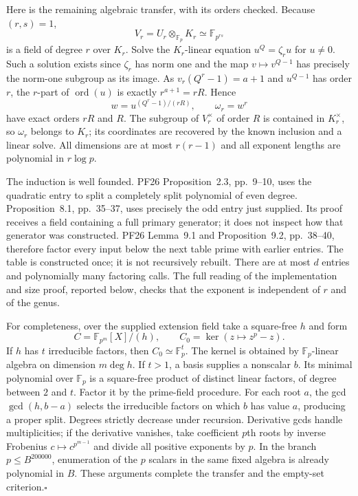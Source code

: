 Here is the remaining algebraic transfer, with its orders checked.
Because $(r,s)=1$,
\[
 V_r=U_r\otimes_{\mathbb F_p}K_r\simeq\mathbb F_{p^{rs}}
\]
is a field of degree $r$ over $K_r$. Solve the $K_r$-linear equation
$u^Q=\zeta_r u$ for $u\ne0$. Such a solution exists since
$\zeta_r$ has norm one and the map $v\mapsto v^{Q-1}$ has precisely
the norm-one subgroup as its image. As
$v_r(Q^r-1)=a+1$ and $u^{Q-1}$ has order $r$, the $r$-part of
$\operatorname{ord}(u)$ is exactly $r^{a+1}=rR$. Hence
\[
 w=u^{(Q^r-1)/(rR)},\qquad \omega_r=w^r
\]
have exact orders $rR$ and $R$. The subgroup of $V_r^\times$ of
order $R$ is contained in $K_r^\times$, so $\omega_r$ belongs to
$K_r$; its coordinates are recovered by the known inclusion and a
linear solve. All dimensions are at most $r(r-1)$ and all exponent
lengths are polynomial in $r\log p$.

The induction is well founded. PF26 Proposition~2.3, pp.~9--10,
uses the quadratic entry to split a completely split polynomial of
even degree. Proposition~8.1, pp.~35--37, uses precisely the odd
entry just supplied. Its proof receives a field containing a full
primary generator; it does not inspect how that generator was
constructed. PF26 Lemma~9.1 and Proposition~9.2, pp.~38--40,
therefore factor every input below the next table prime with earlier
entries. The table is constructed once; it is not recursively rebuilt.
There are at most $d$ entries and polynomially many factoring calls.
The full reading of the implementation and size proof, reported below,
checks that the exponent is independent of $r$ and of the genus.

For completeness, over the supplied extension field take a square-free
$h$ and form
\[
 C=\mathbb F_{p^m}[X]/(h),\qquad
 C_0=\ker(z\mapsto z^p-z).
\]
If $h$ has $t$ irreducible factors, then $C_0\simeq\mathbb F_p^t$.
The kernel is obtained by $\mathbb F_p$-linear algebra on dimension
$m\deg h$. If $t>1$, a basis supplies a nonscalar $b$. Its minimal
polynomial over $\mathbb F_p$ is a square-free product of distinct
linear factors, of degree between $2$ and $t$. Factor it by the
prime-field procedure. For each root $a$, the gcd
$\gcd(h,b-a)$ selects the irreducible factors on which $b$ has value
$a$, producing a proper split. Degrees strictly decrease under
recursion. Derivative gcds handle multiplicities; if the derivative
vanishes, take coefficient $p$th roots by inverse Frobenius
$c\mapsto c^{p^{m-1}}$ and divide all positive exponents by $p$.
In the branch $p\le B^{200000}$, enumeration of the $p$ scalars in
the same fixed algebra is already polynomial in $B$. These arguments
complete the transfer and the empty-set criterion.\hfill$\square$

